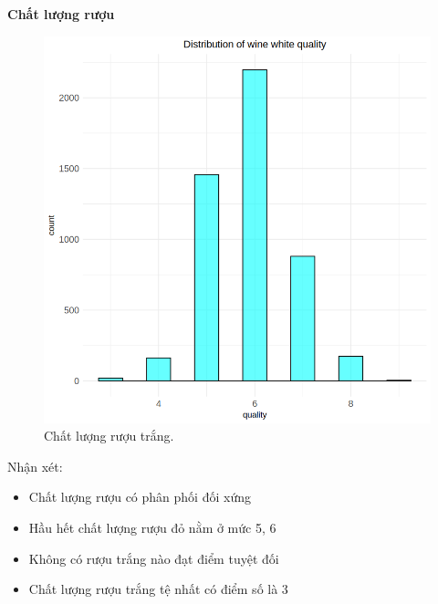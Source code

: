 \textbf{Chất lượng rượu}
\begin{figure}[H]
    \centering
    \includegraphics[width=0.75\columnwidth]{wine_figures/white_quality.png}
    \caption{Chất lượng rượu trắng.}
    \label{fig:white_quality}
\end{figure}
Nhận xét:
\begin{itemize}
    \item Chất lượng rượu có phân phối đối xứng 
    \item Hầu hết chất lượng rượu đỏ nằm ở mức 5, 6
    \item Không có rượu trắng nào đạt điểm tuyệt đối
    \item Chất lượng rượu trắng tệ nhất có điểm số là 3
\end{itemize}

